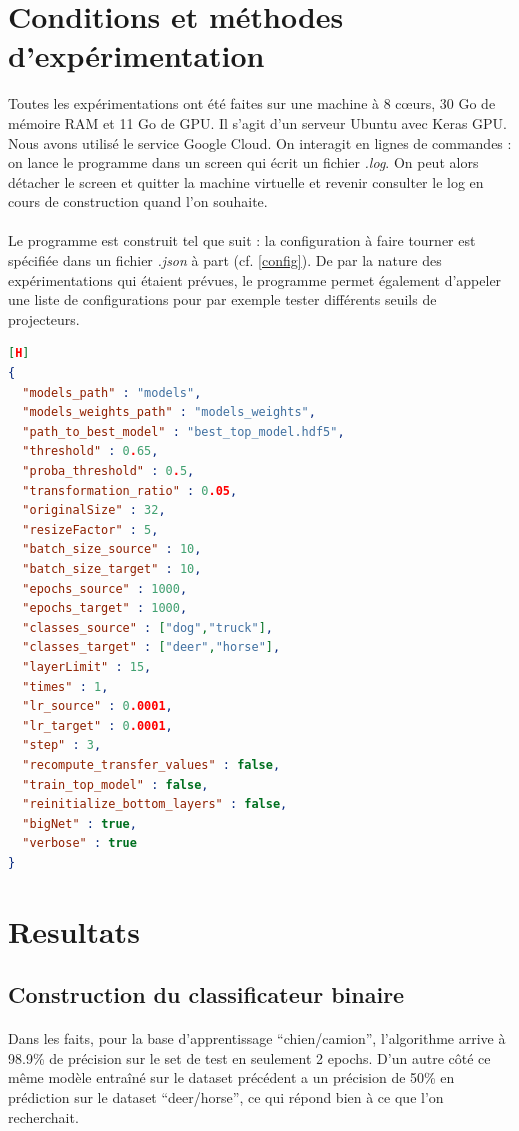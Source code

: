 \documentclass[11 pt]{article}
\begin{document}
\section{Conditions et méthodes d’expérimentation}
Toutes les expérimentations ont été faites sur une machine à 8 cœurs, 30 Go de mémoire RAM et 11 Go de GPU. Il s'agit d'un serveur Ubuntu avec Keras GPU. Nous avons utilisé le service Google Cloud. On interagit en lignes de commandes : on lance le programme dans un screen qui écrit un fichier \textit{.log}. On peut alors détacher le screen et quitter la machine virtuelle et revenir consulter le log en cours de construction quand l'on souhaite.

\paragraph{}Le programme est construit tel que suit : la configuration à faire tourner est spécifiée dans un fichier \textit{.json} à part (cf. \ref{config}). De par la nature des expérimentations qui étaient prévues, le programme permet également d'appeler une liste de configurations pour par exemple tester différents seuils de projecteurs.

\pagebreak 
\begin{lstlisting}[language=json,firstnumber=1,caption={Exemple de configuration},label={config}][H]
{
  "models_path" : "models",
  "models_weights_path" : "models_weights",
  "path_to_best_model" : "best_top_model.hdf5",
  "threshold" : 0.65,
  "proba_threshold" : 0.5,
  "transformation_ratio" : 0.05,
  "originalSize" : 32,
  "resizeFactor" : 5,
  "batch_size_source" : 10,
  "batch_size_target" : 10,
  "epochs_source" : 1000,
  "epochs_target" : 1000,
  "classes_source" : ["dog","truck"],
  "classes_target" : ["deer","horse"],
  "layerLimit" : 15,
  "times" : 1,
  "lr_source" : 0.0001,
  "lr_target" : 0.0001,
  "step" : 3,
  "recompute_transfer_values" : false,
  "train_top_model" : false,
  "reinitialize_bottom_layers" : false,
  "bigNet" : true,
  "verbose" : true
}
\end{lstlisting}

\section{Resultats}
\subsection{Construction du classificateur binaire}
\paragraph{}Dans les faits, pour la base d’apprentissage “chien/camion”, l’algorithme arrive à 98.9\% de précision sur le set de test en seulement 2 epochs. D’un autre côté ce même modèle entraîné sur le dataset précédent a un précision de 50\% en prédiction sur le dataset “deer/horse”, ce qui répond bien à ce que l’on recherchait.
\end{document}
